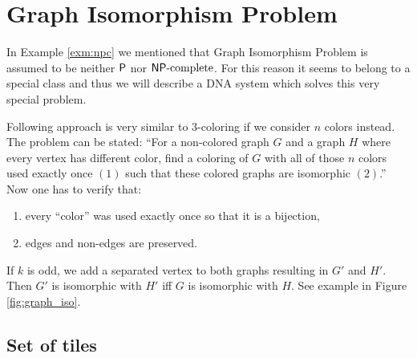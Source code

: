 \section{Graph Isomorphism Problem}

In Example \ref{exm:npc} we mentioned that Graph Isomorphism Problem is assumed to be neither $\P$ nor $\NPC$. For this reason it seems to belong to a special class and thus we will describe a DNA system which solves this very special problem. %

Following approach is very similar to 3-coloring if we consider $n$ colors instead. The problem can be stated: ``For a non-colored graph $G$ and a graph $H$ where every vertex has different color, find a coloring of $G$ with all of those $n$ colors used exactly once $(1)$ such that these colored graphs are isomorphic $(2)$.'' Now one has to verify that:
\begin{enumerate}
	\item every ``color'' was used exactly once so that it is a bijection,
	\item edges and non-edges are preserved.
\end{enumerate}

If $k$ is odd, we add a separated vertex to both graphs resulting in $G'$ and $H'$. Then $G'$ is isomorphic with $H'$ iff $G$ is isomorphic with $H$. See example in Figure \ref{fig:graph_iso}.

\subsection*{Set of tiles}


